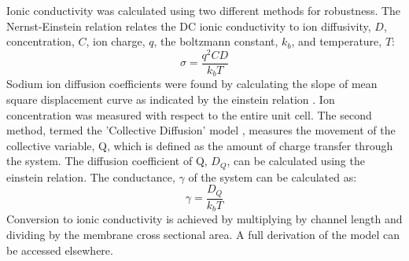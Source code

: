 Ionic conductivity was calculated using two different methods for
robustness. The Nernst-Einstein relation relates 
the DC ionic conductivity to ion diffusivity, $D$, concentration,
$C$, ion charge, $q$, the boltzmann constant, $k_b$, and temperature,
$T$: $$\sigma = \dfrac{q^2CD}{k_b T}$$ Sodium ion diffusion 
coefficients were found by calculating the slope of mean square
displacement curve as indicated by the einstein relation
\cite{einstein_investigations_1956}. Ion concentration was measured with
respect to the entire unit cell. The second method, termed the 'Collective
Diffusion' model \cite{liu_collective_2013}, measures the movement of
the collective variable, Q, which is defined as the amount of charge 
transfer through the system. The diffusion coefficient of Q, $D_Q$, can
be calculated using the einstein relation. The conductance, $\gamma$ of
the system can be calculated as: $$ \gamma = \dfrac{D_Q}{k_b T} $$ 
Conversion to ionic conductivity is achieved by multiplying by channel 
length and dividing by the membrane cross sectional area. A full 
derivation of the model can be accessed elsewhere\cite{liu_collective_2013}.  
